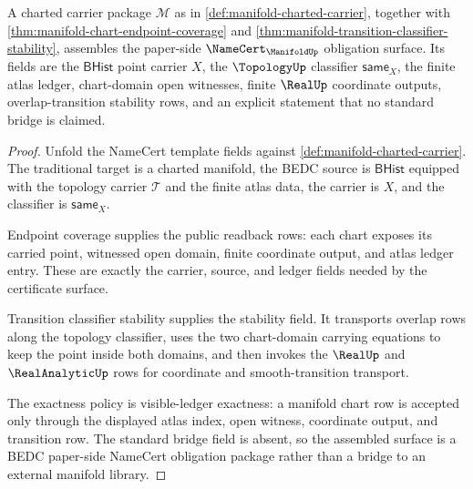 \begin{theorem}
\label{thm:manifold-charted-namecert-surface}
A charted carrier package $\mathcal{M}$ as in
\autoref{def:manifold-charted-carrier}, together with
\autoref{thm:manifold-chart-endpoint-coverage} and
\autoref{thm:manifold-transition-classifier-stability}, assembles the
paper-side $\NameCert_{\ManifoldUp}$ obligation surface. Its fields are the
$\mathsf{BHist}$ point carrier $X$, the $\TopologyUp$ classifier
$\mathsf{same}_X$, the finite atlas ledger, chart-domain open witnesses,
finite $\RealUp$ coordinate outputs, overlap-transition stability rows, and an
explicit statement that no standard bridge is claimed.
\end{theorem}
\begin{proof}
Unfold the NameCert template fields against
\autoref{def:manifold-charted-carrier}. The traditional target is a charted
manifold, the BEDC source is $\mathsf{BHist}$ equipped with the topology
carrier $\mathcal{T}$ and the finite atlas data, the carrier is $X$, and the
classifier is $\mathsf{same}_X$.

Endpoint coverage supplies the public readback rows: each chart exposes its
carried point, witnessed open domain, finite coordinate output, and atlas
ledger entry. These are exactly the carrier, source, and ledger fields needed
by the certificate surface.

Transition classifier stability supplies the stability field. It transports
overlap rows along the topology classifier, uses the two chart-domain carrying
equations to keep the point inside both domains, and then invokes the
$\RealUp$ and $\RealAnalyticUp$ rows for coordinate and smooth-transition
transport.

The exactness policy is visible-ledger exactness: a manifold chart row is
accepted only through the displayed atlas index, open witness, coordinate
output, and transition row. The standard bridge field is absent, so the
assembled surface is a BEDC paper-side NameCert obligation package rather than
a bridge to an external manifold library.
\end{proof}

